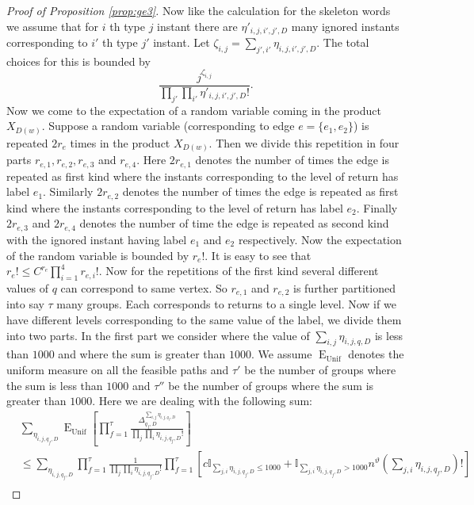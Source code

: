 \documentclass[12pt]{article}
\numberwithin{equation}{section}
\numberwithin{equation}{section}
\theoremstyle{definition}
\DeclareMathOperator{\E}{E} \DeclareMathOperator{\var}{Var}
\renewcommand{\1}{\bf 1}
\begin{document}
\begin{proof}[Proof of Proposition \ref{prop:ge3}]
Now like the calculation for the skeleton words we assume that for $i$ th type $j$ instant there are $\eta'_{i,j,i',j',D}$ many ignored instants corresponding to $i'$ th type $j'$ instant. Let $\zeta_{i,j}=\sum_{j',i'} \eta_{i,j,i',j',D}$. The total choices for this is bounded by 
\begin{equation}\label{eq:dyckrepty2}
\frac{j^{\zeta_{i,j}}}{\prod_{j'}\prod_{i'}\eta'_{i,j,i',j',D}!}.
\end{equation}
Now we come to the expectation of a random variable coming in the product $X_{D(w)}$. Suppose a random variable (corresponding to edge $e=\{ e_{1},e_{2} \}$) is repeated $2r_{e}$ times in the product $X_{D(w)}$. Then we divide this repetition in four parts $r_{e,1},r_{e,2},r_{e,3}$ and $r_{e,4}$. Here $2r_{e,1}$ denotes the number of times the edge is repeated as first kind where the instants corresponding to the level of return has label $e_{1}$. Similarly $2r_{e,2}$ denotes the number of times the edge is repeated as first kind where the instants corresponding to the level of return has label $e_{2}$. Finally $2r_{e,3}$ and $2r_{e,4}$ denotes the number of time the edge is repeated as second kind with the ignored instant having label $e_{1}$ and $e_{2}$ respectively. Now the expectation of the random variable is bounded by $r_{e}!$. It is easy to see that $r_{e}! \le C^{r_{e}} \prod_{i=1}^{4} r_{e,i}!$. Now for the repetitions of the first kind several different values of $q$ can correspond to same vertex. So $r_{e,1}$ and $r_{e,2}$ is further partitioned into say $\tau$ many groups. Each corresponds to returns to a single level. Now if we have different levels corresponding to the same value of the label, we divide them into two parts. In the first part we consider where the value of $\sum_{i,j}\eta_{i,j,q,D}$ is less than $1000$ and where the sum is greater than $1000$. We assume $\E_{\text{Unif}}$ denotes the uniform measure on all the feasible paths and $\tau'$ be the number of groups where the sum is less than $1000$ and $\tau''$ be the number of groups where the sum is greater than $1000$.  Here we are dealing with the following sum:
\begin{equation}\label{eq:otherpart}
\begin{split}
&\sum_{\eta_{i,j,q_{f},D}} \E_{\text{Unif}}\left[ \prod_{f=1}^{\tau}\frac{\Delta_{q_{f},D}^{\sum_{i,j}\eta_{i,j,q_{f},D}}}{\prod_{j}\prod_{i} \eta_{i,j,q_{f},D}!} \right]\\
&\le \sum_{\eta_{i,j,q_{f},D}} \prod_{f=1}^{\tau} \frac{1}{\prod_{j}\prod_{i}\eta_{i,j,q_{f},D}!} \prod_{f=1}^{\tau} \left[ c\mathbb{I}_{\sum_{j,i}\eta_{i,j,q_{f},D}\le 1000} + \mathbb{I}_{\sum_{j,i}\eta_{i,j,q_{f},D}> 1000}n^{\vartheta}\left( \sum_{j,i} \eta_{i,j,q_{f},D} \right)! \right]\\

\end{split}
\end{equation}
\end{proof}
\end{document}
